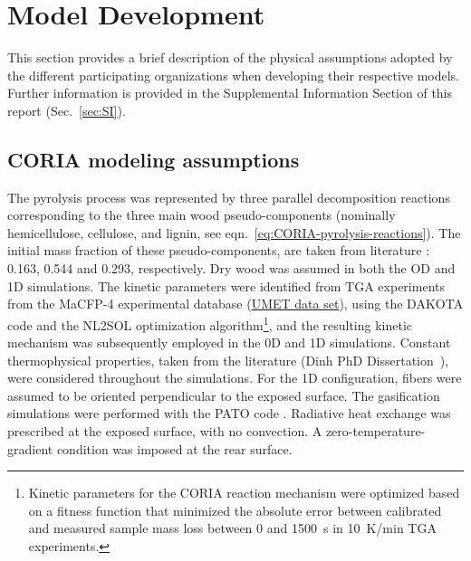 \documentclass{article}
\newcommand{\cmark}{\ding{51}} %
\newcommand{\xmark}{\ding{55}} %
\begin{document}


\section{Model Development}
\label{sec:Models}
This section provides a brief description of the physical assumptions adopted by the different participating organizations when developing their respective models. Further information is provided in the Supplemental Information Section of this report (Sec.~\ref{sec:SI}).

\subsection{CORIA modeling assumptions}

The pyrolysis process was represented by three parallel decomposition reactions corresponding to the three main wood pseudo-components (nominally hemicellulose, cellulose, and lignin, see eqn.~\ref{eq:CORIA-pyrolysis-reactions}). The initial mass fraction of these pseudo-components, are taken from literature \cite{marquez2021kinetic}: 0.163, 0.544 and 0.293, respectively. Dry wood was assumed in both the OD and 1D simulations. The kinetic parameters were identified from TGA experiments from the MaCFP-4 experimental database (\href{https://github.com/MaCFP/matl-db/tree/master/Wood/Calibration_Data/UMET}{UMET data set}), using the DAKOTA code and the NL2SOL optimization algorithm\footnote{Kinetic parameters for the CORIA reaction mechanism were optimized based on a fitness function that minimized the absolute error between calibrated and measured sample mass loss between 0 and 1500~s in 10~K/min TGA experiments.}, and the resulting kinetic mechanism was subsequently employed in the 0D and 1D simulations. Constant thermophysical properties, taken from the literature (Dinh PhD Dissertation~\cite{dinh2024developpement}), were considered throughout the simulations. For the 1D configuration, fibers were assumed to be oriented perpendicular to the exposed surface. The gasification simulations were performed with the PATO code \cite{lachaud2017generic}. Radiative heat exchange was prescribed at the exposed surface, with no convection. A zero-temperature-gradient condition was imposed at the rear surface.
\end{document}
